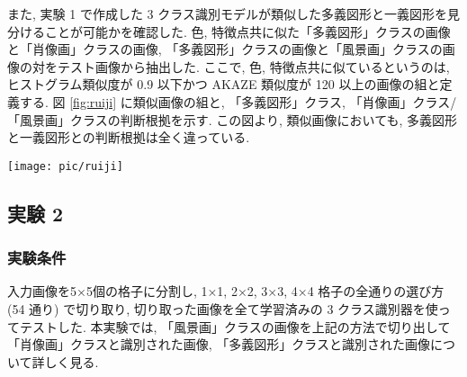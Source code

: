\documentclass[twocolumn]{jarticle}     %
\newcommand{\1}{\mbox{1}\hspace{-0.25em}\mbox{l}}
\begin{document}
また, 実験 1 で作成した 3 クラス識別モデルが類似した多義図形と一義図形を見分けることが可能かを確認した. 
色, 特徴点共に似た「多義図形」クラスの画像と「肖像画」クラスの画像, 「多義図形」クラスの画像と「風景画」クラスの画像の対をテスト画像から抽出した. ここで, 色, 特徴点共に似ているというのは, ヒストグラム類似度が 0.9 以下かつ AKAZE 類似度が 120 以上の画像の組と定義する. 図 \ref{fig:ruiji} に類似画像の組と, 「多義図形」クラス, 「肖像画」クラス/「風景画」クラスの判断根拠を示す. この図より, 類似画像においても, 多義図形と一義図形との判断根拠は全く違っている.
\begin{figure*}
	\centering
	\texttt{[image: pic/ruiji]}
	\caption{実験1 類似画像の識別}
	\label{fig:ruiji}
\end{figure*}

\subsection{実験 2}
\subsubsection{実験条件}
入力画像を5×5個の格子に分割し, 1×1, 2×2, 3×3, 4×4 格子の全通りの選び方 (54 通り) で切り取り, 切り取った画像を全て学習済みの 3 クラス識別器を使ってテストした. 本実験では, 「風景画」クラスの画像を上記の方法で切り出して「肖像画」クラスと識別された画像, 「多義図形」クラスと識別された画像について詳しく見る.
\end{document}
